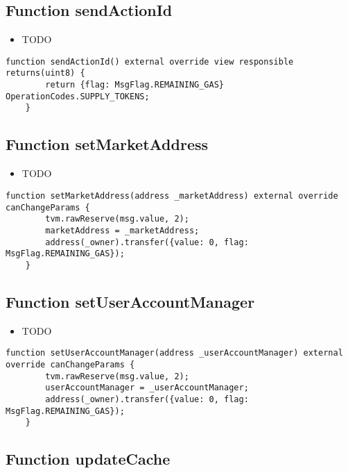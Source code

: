 \subsection{Function sendActionId}

\noindent\begin{itemize}
\item TODO
\end{itemize}

\begin{lstlisting}[firstnumber=60]
    function sendActionId() external override view responsible returns(uint8) {
        return {flag: MsgFlag.REMAINING_GAS} OperationCodes.SUPPLY_TOKENS;
    }
\end{lstlisting}

\subsection{Function setMarketAddress}

\noindent\begin{itemize}
\item TODO
\end{itemize}

\begin{lstlisting}[firstnumber=68]
    function setMarketAddress(address _marketAddress) external override canChangeParams {
        tvm.rawReserve(msg.value, 2);
        marketAddress = _marketAddress;
        address(_owner).transfer({value: 0, flag: MsgFlag.REMAINING_GAS});
    }
\end{lstlisting}

\subsection{Function setUserAccountManager}

\noindent\begin{itemize}
\item TODO
\end{itemize}

\begin{lstlisting}[firstnumber=74]
    function setUserAccountManager(address _userAccountManager) external override canChangeParams {
        tvm.rawReserve(msg.value, 2);
        userAccountManager = _userAccountManager;
        address(_owner).transfer({value: 0, flag: MsgFlag.REMAINING_GAS});
    }
\end{lstlisting}

\subsection{Function updateCache}

